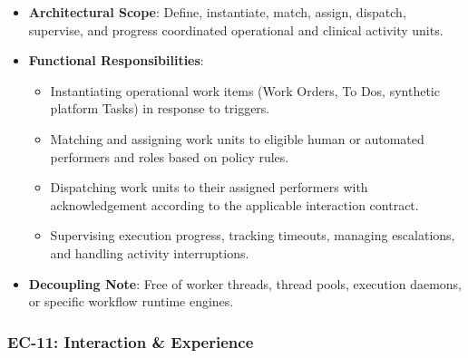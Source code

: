 \begin{itemize}

\item
\textbf{Architectural Scope}: Define, instantiate, match, assign, dispatch, supervise, and progress coordinated operational and clinical activity units.



\item
\textbf{Functional Responsibilities}:


\begin{itemize}

\item
Instantiating operational work items (Work Orders, To Dos, synthetic platform Tasks) in response to triggers.



\item
Matching and assigning work units to eligible human or automated performers and roles based on policy rules.



\item
Dispatching work units to their assigned performers with acknowledgement according to the applicable interaction contract.



\item
Supervising execution progress, tracking timeouts, managing escalations, and handling activity interruptions.



\end{itemize}


\item
\textbf{Decoupling Note}: Free of worker threads, thread pools, execution daemons, or specific workflow runtime engines.



\end{itemize}
\label{rad:enterprise:193}
\subsubsection*{EC-11: Interaction \& Experience}
\label{rad:enterprise:194}

